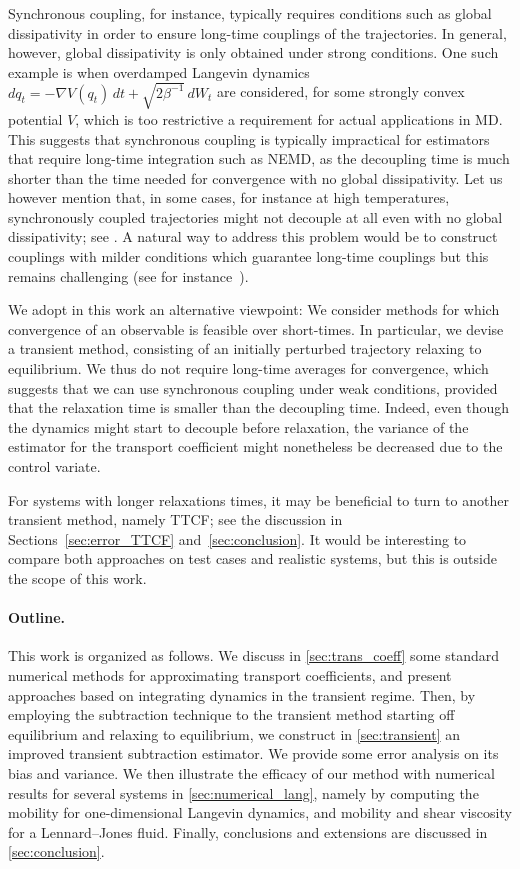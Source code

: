 \documentclass[11pt]{article}
\theoremstyle{definition}
\let\oldparagraph=\paragraph
\renewcommand\paragraph[1]{\oldparagraph{#1.}}
\begin{document}
Synchronous coupling, for instance, typically requires conditions such as global dissipativity in order to ensure long-time couplings of the trajectories. In general, however, global dissipativity is only obtained under strong conditions. One such example is when overdamped Langevin dynamics $dq_t = -\nabla V(q_t) \, dt + \sqrt{2\beta^{-1}} \, dW_t$ are considered, for some strongly convex potential $V$, which is too restrictive a requirement for actual applications in MD. This suggests that synchronous coupling is typically impractical for estimators that require long-time integration such as NEMD, as the decoupling time is much shorter than the time needed for convergence with no global dissipativity. Let us however mention that, in some cases, for instance at high temperatures, synchronously coupled trajectories might not decouple at all even with no global dissipativity; see \cite{monmarche2023}. A natural way to address this problem would be to construct couplings with milder conditions which guarantee long-time couplings but this remains challenging (see for instance~\cite{darshan2024}).

We adopt in this work an alternative viewpoint: We consider methods for which convergence of an observable is feasible over short-times. In particular, we devise a transient method, consisting of an initially perturbed trajectory relaxing to equilibrium. We thus do not require long-time averages for convergence, which suggests that we can use synchronous coupling under weak conditions, provided that the relaxation time is smaller than the decoupling time. Indeed, even though the dynamics might start to decouple before relaxation, the variance of the estimator for the transport coefficient might nonetheless be decreased due to the control variate.

For systems with longer relaxations times, it may be beneficial to turn to another transient method, namely TTCF; see the discussion in Sections~\ref{sec:error_TTCF} and~\ref{sec:conclusion}. It would be interesting to compare both approaches on test cases and realistic systems, but this is outside the scope of this work.

\paragraph{Outline} This work is organized as follows. We discuss in \cref{sec:trans_coeff} some standard numerical methods for approximating transport coefficients, and present approaches based on integrating dynamics in the transient regime. Then, by employing the subtraction technique to the transient method starting off equilibrium and relaxing to equilibrium, we construct in \cref{sec:transient} an improved transient subtraction estimator. We provide some error analysis on its bias and variance. We then illustrate the efficacy of our method with numerical results for several systems in \cref{sec:numerical_lang}, namely by computing the mobility for one-dimensional Langevin dynamics, and mobility and shear viscosity for a Lennard--Jones fluid. Finally, conclusions and extensions are discussed in \cref{sec:conclusion}.
\end{document}
